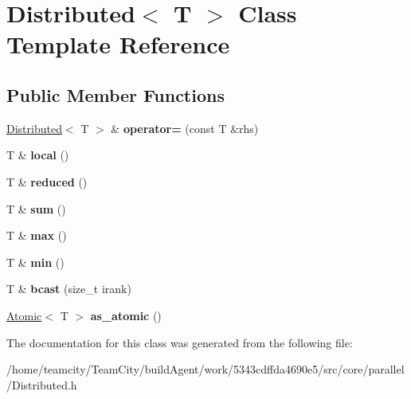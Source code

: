 \hypertarget{classDistributed}{}\section{Distributed$<$ T $>$ Class Template Reference}
\label{classDistributed}
\subsection*{Public Member Functions}
\begin{DoxyCompactItemize}
\item 
\hyperlink{classDistributed}{Distributed}$<$ T $>$ \& {\bfseries operator=} (const T \&rhs)\hypertarget{classDistributed_a9a6165b77959bba3421431d6b8b225b4}{}\label{classDistributed_a9a6165b77959bba3421431d6b8b225b4}

\item 
T \& {\bfseries local} ()\hypertarget{classDistributed_a218d6294ba8ff92a6255a2f4fbc01725}{}\label{classDistributed_a218d6294ba8ff92a6255a2f4fbc01725}

\item 
T \& {\bfseries reduced} ()\hypertarget{classDistributed_a701315b13407247153f565a083c8edac}{}\label{classDistributed_a701315b13407247153f565a083c8edac}

\item 
T \& {\bfseries sum} ()\hypertarget{classDistributed_a1e1730d8e1a0ec4f3a3922e02aaa798c}{}\label{classDistributed_a1e1730d8e1a0ec4f3a3922e02aaa798c}

\item 
T \& {\bfseries max} ()\hypertarget{classDistributed_a60683932ad5eb39d3af610d1906b0504}{}\label{classDistributed_a60683932ad5eb39d3af610d1906b0504}

\item 
T \& {\bfseries min} ()\hypertarget{classDistributed_a90e34a3200e01d485d17fcf74f65a828}{}\label{classDistributed_a90e34a3200e01d485d17fcf74f65a828}

\item 
T \& {\bfseries bcast} (size\+\_\+t irank)\hypertarget{classDistributed_a4c9b4dd31434fef8a4d98a4584930b1f}{}\label{classDistributed_a4c9b4dd31434fef8a4d98a4584930b1f}

\item 
\hyperlink{structAtomic}{Atomic}$<$ T $>$ {\bfseries as\+\_\+atomic} ()\hypertarget{classDistributed_a7ae657377ba1109cc2995fb4e817a971}{}\label{classDistributed_a7ae657377ba1109cc2995fb4e817a971}

\end{DoxyCompactItemize}


The documentation for this class was generated from the following file\+:\begin{DoxyCompactItemize}
\item 
/home/teamcity/\+Team\+City/build\+Agent/work/5343cdffda4690e5/src/core/parallel/Distributed.\+h\end{DoxyCompactItemize}
